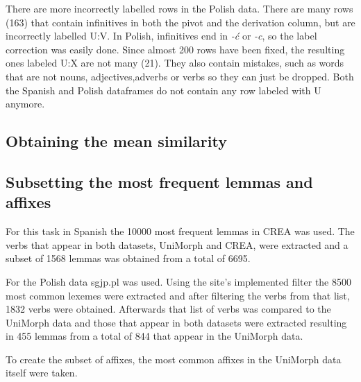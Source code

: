\documentclass[12pt]{article}
\begin{document}
There are more incorrectly labelled rows in the Polish data. There are many rows (163) that contain infinitives in both the pivot and the derivation column, but are incorrectly labelled U:V. In Polish, infinitives end in \textit{-ć} or \textit{-c}, so the label correction was easily done. Since almost 200 rows have been fixed, the resulting ones labeled U:X are not many (21). They also contain mistakes, such as words that are not nouns, adjectives,adverbs or verbs so they can just be dropped. Both the Spanish and Polish dataframes do not contain any row labeled with U anymore.

\subsection{Obtaining the mean similarity}


\subsection{Subsetting the most frequent lemmas and affixes}

For this task in Spanish the 10000 most frequent lemmas in CREA was used. The verbs that appear in both datasets, UniMorph and CREA, were extracted and a subset of 1568 lemmas was obtained from a total of 6695. 

For the Polish data sgjp.pl was used. Using the site's implemented filter the 8500 most common lexemes were extracted and after filtering the verbs from that list, 1832 verbs were obtained. Afterwards that list of verbs was compared to the UniMorph data and  those that appear in both datasets were extracted resulting in 455 lemmas from a total of 844 that appear in the UniMorph data.

To create the subset of affixes, the most common affixes in the UniMorph data itself were taken.
\end{document}
